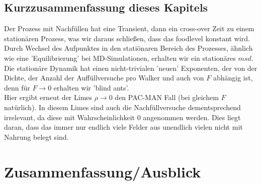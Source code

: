 \documentclass[a4paper, 12pt]{report}
\begin{document}
\clearpage

\section{Kurzzusammenfassung dieses Kapitels}
Der Prozess mit Nachfüllen hat eine Transient, dann ein cross-over Zeit zu einem stationären Prozess, was wir daraus schließen, dass das foodlevel konstant wird. Durch Wechsel des Aufpunktes in den statiönaren Bereich des Prozesses, ähnlich wie eine 'Equilibrierung' bei MD-Simulationen, erhalten wir ein stationäres $msd$.
\\
Die stationäre Dynamik hat einen nicht-trivialen 'neuen' Exponenten, der von der Dichte, der Anzahl der Auffüllversuche pro Walker und auch von $F$ abhängig ist, denn für $F\rightarrow 0$ erhalten wir 'blind ants'.
\\
Hier ergibt erneut der Limes $\rho \rightarrow 0$ den PAC-MAN Fall (bei gleichem $F$ natürlich). In diesem Limes sind auch die Nachfüllversuche dementsprechend irrelevant, da diese mit Wahrscheinlichkeit 0 angenommen werden. Dies liegt daran, dass das immer nur endlich viele Felder aus unendlich vielen nicht mit Nahrung belegt sind.
\chapter{Zusammenfassung/Ausblick}
\end{document}
